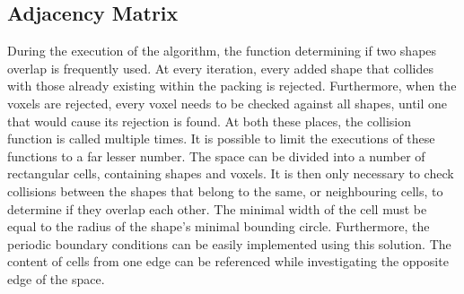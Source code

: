 \documentclass[12pt, oneside]{report}
\begin{document}
\subsection{Adjacency Matrix}

During the execution of the algorithm, the function determining if two shapes overlap is frequently used. At every iteration, every added shape that collides with those already existing within the packing is rejected. Furthermore, when the voxels are rejected, every voxel needs to be checked against all shapes, until one that would cause its rejection is found. At both these places, the collision function is called multiple times.\newline
It is possible to limit the executions of these functions to a far lesser number. The space can be divided into a number of rectangular cells, containing shapes and voxels. It is then only necessary to check collisions between the shapes that belong to the same, or neighbouring cells, to determine if they overlap each other. The minimal width of the cell must be equal to the radius of the shape's minimal bounding circle. \newline
Furthermore, the periodic boundary conditions can be easily implemented using this solution. The content of cells from one edge can be referenced while investigating the opposite edge of the space.
\end{document}
